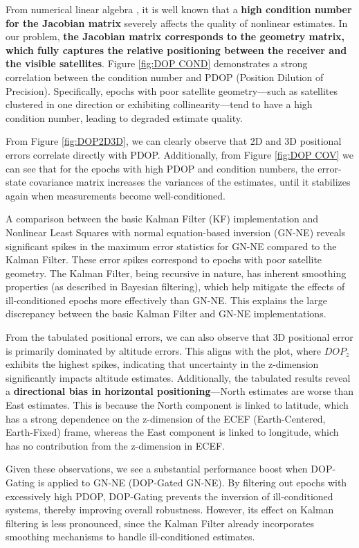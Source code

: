 \documentclass[conference]{IEEEtran}
\begin{document}
From numerical linear algebra \cite{trefethen1997}, it is well known that a \textbf{high condition number for the Jacobian matrix} severely affects the quality of nonlinear estimates. In our problem, \textbf{the Jacobian matrix corresponds to the geometry matrix, which fully captures the relative positioning between the receiver and the visible satellites}. Figure \ref{fig:DOP COND} demonstrates a strong correlation between the condition number and PDOP (Position Dilution of Precision). Specifically, epochs with poor satellite geometry—such as satellites clustered in one direction or exhibiting collinearity—tend to have a high condition number, leading to degraded estimate quality.

From Figure \ref{fig:DOP2D3D}, we can clearly observe that 2D and 3D positional errors correlate directly with PDOP. Additionally, from Figure \ref{fig:DOP COV} we can see that for the epochs with high PDOP and condition numbers, the error-state covariance matrix increases the variances of the estimates, until it stabilizes again when measurements become well-conditioned.

A comparison between the basic Kalman Filter (KF) implementation and Nonlinear Least Squares with normal equation-based inversion (GN-NE) reveals significant spikes in the maximum error statistics for GN-NE compared to the Kalman Filter. These error spikes correspond to epochs with poor satellite geometry. The Kalman Filter, being recursive in nature, has inherent smoothing properties (as described in Bayesian filtering), which help mitigate the effects of ill-conditioned epochs more effectively than GN-NE. This explains the large discrepancy between the basic Kalman Filter and GN-NE implementations.

From the tabulated positional errors, we can also observe that 3D positional error is primarily dominated by altitude errors. This aligns with the plot, where $DOP_z$ exhibits the highest spikes, indicating that uncertainty in the z-dimension significantly impacts altitude estimates. Additionally, the tabulated results reveal a \textbf{directional bias in horizontal positioning}—North estimates are worse than East estimates. This is because the North component is linked to latitude, which has a strong dependence on the z-dimension of the ECEF (Earth-Centered, Earth-Fixed) frame, whereas the East component is linked to longitude, which has no contribution from the z-dimension in ECEF.

Given these observations, we see a substantial performance boost when DOP-Gating is applied to GN-NE (DOP-Gated GN-NE). By filtering out epochs with excessively high PDOP, DOP-Gating prevents the inversion of ill-conditioned systems, thereby improving overall robustness. However, its effect on Kalman filtering is less pronounced, since the Kalman Filter already incorporates smoothing mechanisms to handle ill-conditioned estimates.
\end{document}
